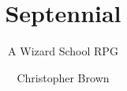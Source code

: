 \documentclass[a4paper,10pt,twocolumn]{memoir}
\title{Septennial}
\subtitle{A Wizard School RPG}
\author{Christopher Brown}
\begin{document}
\frontmatter

\titlepage


\tableofcontents*

\mainmatter



\backmatter

\printindex
\end{document}
